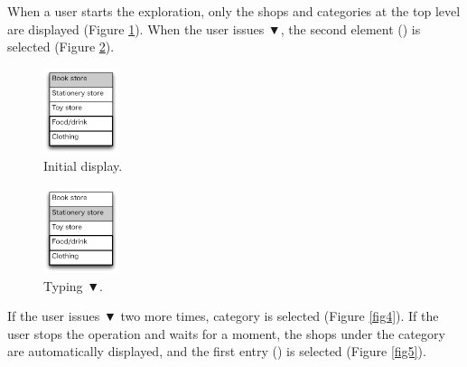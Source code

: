 \documentclass[conference]{IEEEtran}
\def\down{▼}
\begin{document}
When a user starts the exploration, only the shops and categories
at the top level are displayed (Figure \ref{fig2}).
When the user issues {\down},
the second element () is selected (Figure \ref{fig3}).

\def\menuwidth{22mm}

\begin{figure}[H]
\centerline{\includegraphics[width=\menuwidth, bb=0 0 139 157]{figures/fig2.pdf}}
\caption{Initial display.}
\label{fig2}
\end{figure}

\begin{figure}[H]
\centerline{\includegraphics[width=\menuwidth,bb=0 0 139 157]{figures/fig3.pdf}}
\caption{Typing {\down}.}
\label{fig3}
\end{figure}

If the user issues {\down} two more times, 
 category is selected (Figure \ref{fig4}).
If the user stops the operation and waits for a moment, the shops under the 
category are automatically displayed,
and the first entry () is selected (Figure \ref{fig5}).
\end{document}
